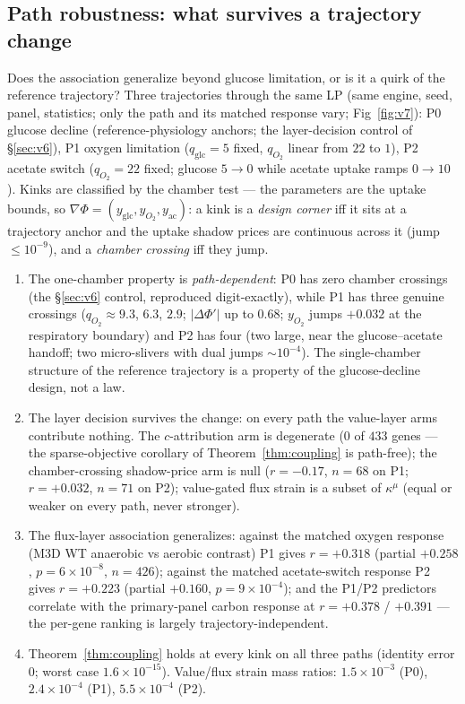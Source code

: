 \documentclass[11pt,a4paper]{article}
\theoremstyle{plain}
\theoremstyle{definition}
\theoremstyle{remark}
\newcommand{\kmu}{\kappa^{\mu}}
\begin{document}
\subsection{Path robustness: what survives a trajectory change}
\label{sec:v7}
Does the association generalize beyond glucose limitation, or is it a
quirk of the reference trajectory? Three trajectories through the same LP (same engine, seed, panel, statistics; only the path and its matched response vary; Fig~\ref{fig:v7}): P0 glucose decline (reference-physiology anchors; the layer-decision control of \S\ref{sec:v6}), P1 oxygen limitation
($q_{\mathrm{glc}} = 5$ fixed, $q_{O_2}$ linear from $22$ to $1$),
P2 acetate switch ($q_{O_2} = 22$ fixed; glucose $5 \to 0$ while
acetate uptake ramps $0 \to 10$). Kinks are classified by the
chamber test --- the parameters are the uptake bounds, so
$\nabla\Phi = (y_{\mathrm{glc}}, y_{O_2}, y_{\mathrm{ac}})$: a kink is
a \emph{design corner} iff it sits at a trajectory anchor and the
uptake shadow prices are continuous across it (jump $\le 10^{-9}$),
and a \emph{chamber crossing} iff they jump.
\begin{enumerate}[label=(\roman*),leftmargin=2em]
\item The one-chamber property is \emph{path-dependent}: P0 has zero
      chamber crossings (the \S\ref{sec:v6} control, reproduced digit-exactly), while P1 has
      three genuine crossings ($q_{O_2} \approx 9.3$, $6.3$, $2.9$;
      $|\Delta\Phi'|$ up to $0.68$; $y_{O_2}$ jumps $+0.032$ at the
      respiratory boundary) and P2 has four (two large, near the
      glucose--acetate handoff; two micro-slivers with dual jumps
      $\sim 10^{-4}$). The single-chamber structure of the reference trajectory is a property of the glucose-decline design, not a law.
\item The layer decision survives the change: on every path the
      value-layer arms contribute nothing. The $c$-attribution arm is
      degenerate ($0$ of $433$ genes --- the sparse-objective
      corollary of Theorem~\ref{thm:coupling} is path-free); the
      chamber-crossing shadow-price arm is null ($r = -0.17$,
      $n = 68$ on P1; $r = +0.032$, $n = 71$ on P2); value-gated flux
      strain is a subset of $\kmu$ (equal or weaker on every path,
      never stronger).
\item The flux-layer association generalizes: against the matched
      oxygen response (M3D WT anaerobic vs aerobic contrast) P1 gives
      $r = +0.318$ (partial $+0.258$, $p = 6 \times 10^{-8}$,
      $n = 426$); against the matched acetate-switch response P2
      gives $r = +0.223$ (partial $+0.160$, $p = 9 \times
      10^{-4}$); and the P1/P2 predictors correlate with the primary-panel carbon response at $r = +0.378$ / $+0.391$ --- the per-gene
      ranking is largely trajectory-independent.
\item Theorem~\ref{thm:coupling} holds at every kink on all three
      paths (identity error $0$; worst case $1.6 \times 10^{-15}$).
      Value/flux strain mass ratios: $1.5 \times 10^{-3}$ (P0),
      $2.4 \times 10^{-4}$ (P1), $5.5 \times 10^{-4}$ (P2).
\end{enumerate}
\end{document}

